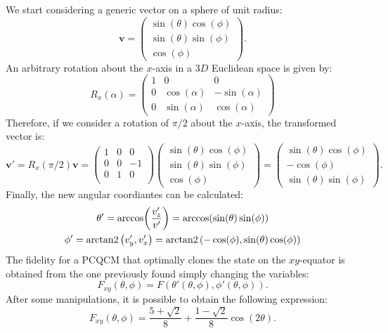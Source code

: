 We start considering a generic vector on a sphere of unit radius:
\[
    \bm v = \begin{pmatrix}
        \sin(\theta)\cos(\phi)\\
        \sin(\theta)\sin(\phi)\\
        \cos(\phi)
    \end{pmatrix}.
\]
An arbitrary rotation about the $x$-axis in a $3D$ Euclidean space is given by:
\[
    R_x(\alpha)=\begin{pmatrix}
        1 & 0 & 0 \\
        0 & \cos(\alpha) & -\sin(\alpha) \\
        0 & \sin(\alpha) & \cos(\alpha)
    \end{pmatrix}
\]
Therefore, if we consider a rotation of $\pi/2$ about the $x$-axis, the transformed vector is:
\[
    \bm v' = R_x(\pi/2)\bm v = \begin{pmatrix}
        1 & 0 & 0 \\
        0 & 0 & -1 \\
        0 & 1 & 0 \\
    \end{pmatrix}
    \begin{pmatrix}
        \sin(\theta)\cos(\phi)\\
        \sin(\theta)\sin(\phi)\\
        \cos(\phi)
    \end{pmatrix}=\begin{pmatrix}
        \sin(\theta)\cos(\phi)\\
        -\cos(\phi)\\
        \sin(\theta)\sin(\phi)
    \end{pmatrix}.
\]
Finally, the new angular coordiantes can be calculated:
\[
    \begin{gathered}
    \theta'=\arccos(\frac{v'_z}{v'})=\arccos(\sin(\theta)\sin(\phi))\\
    \phi'=\operatorname{arctan2}\left(v'_y,v'_x\right)=\operatorname{arctan2}\left(-\cos(\phi),\sin(\theta)\cos(\phi)\right)
    \end{gathered}
\]
The fidelity for a PCQCM that optimally clones the state on the $xy$-equator is obtained from the one previously found simply changing the variables:
\[
    F_{xy}(\theta,\phi)=F(\theta'(\theta,\phi),\phi'(\theta,\phi)).
\]
After some manipulations, it is possible to obtain the following expression:
\begin{equation}
    F_{xy}(\theta,\phi)=\frac{5+\sqrt{2}}{8}+\frac{1-\sqrt{2}}{8}\cos(2\theta).
\end{equation}
